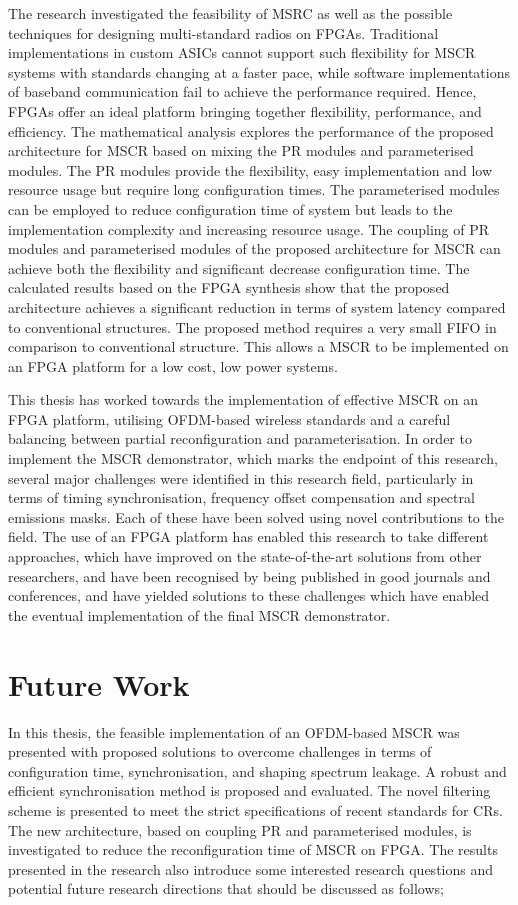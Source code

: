 The research investigated the feasibility of MSRC as well as the possible techniques for designing multi-standard radios on FPGAs.
Traditional implementations in custom ASICs cannot support such flexibility for MSCR systems with standards changing at a faster pace, while software implementations of baseband communication fail to achieve the performance required.
Hence, FPGAs offer an ideal platform bringing together flexibility, performance, and efficiency.
The mathematical analysis explores the performance of the proposed architecture for MSCR based on mixing the PR modules and parameterised modules.
The PR modules provide the flexibility, easy implementation and low resource usage but require long configuration times.
The parameterised modules can be employed to reduce configuration time of system but leads to the implementation complexity and increasing resource usage.
The coupling of PR modules and parameterised modules of the proposed architecture for MSCR can achieve both the flexibility and significant decrease configuration time. 
The calculated results based on the FPGA synthesis show that the proposed architecture achieves a significant reduction in terms of system latency compared to conventional structures. 
The proposed method requires a very small FIFO in comparison to conventional structure. This allows a MSCR to be implemented on an FPGA platform for a low cost, low power systems.

This thesis has worked towards the implementation of effective MSCR on an FPGA platform, utilising OFDM-based wireless standards and a careful balancing between partial reconfiguration and parameterisation. 
In order to implement the MSCR demonstrator, which marks the endpoint of this research, several major challenges were identified in this research field, particularly in terms of timing synchronisation, frequency offset compensation and spectral emissions masks. 
Each of these have been solved using novel contributions to the field. 
The use of an FPGA platform has enabled this research to take different approaches, which have improved on the state-of-the-art solutions from other researchers, and have been recognised by being published in good journals and conferences, and have yielded solutions to these challenges which have enabled the eventual implementation of the final MSCR demonstrator.

\section{Future Work}
In this thesis, the feasible implementation of an OFDM-based MSCR was presented with proposed solutions to overcome challenges in terms of configuration time, synchronisation, and shaping spectrum leakage.
A robust and efficient synchronisation method is proposed and evaluated. 
The novel filtering scheme is presented to meet the strict specifications of recent standards for CRs. 
The new architecture, based on coupling PR and parameterised modules, is investigated to reduce the reconfiguration time of MSCR  on FPGA. 
The results presented in the research also introduce some interested research questions and potential future research directions that should be discussed as follows;

